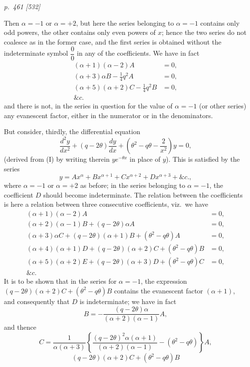 \documentclass[11pt,a4paper]{article}
\theoremstyle{plain}
\theoremstyle{definition}
\begin{document}
\clearpage

\bigskip
\textit{p.~461 [532]}
\smallskip

Then $\alpha=-1$ or $\alpha=+2$, but here the series belonging to $\alpha=-1$ contains only odd
powers, the other contains only even powers of $x$; hence the two series do not
coalesce as in the former case, and the first series is obtained without the indeterminate symbol $\dfrac{0}{0}$ in any of the coefficients. We have in fact
\begin{align*}
(\alpha+1)(\alpha-2)A&=0,\\
(\alpha+3)\alpha B-\tfrac14q^2A&=0,\\
(\alpha+5)(\alpha+2)C-\tfrac14q^2B&=0,\\
\&c.
\end{align*}
and there is not, in the series in question for the value of $\alpha = -1$ (or other series) any evanescent
factor, either in the numerator or in the denominators.

But consider, thirdly, the differential equation
\[
\frac{d^2y}{dx^2}+(q-2\theta)\frac{dy}{dx}
+\left(\theta^2-q\theta-\frac{2}{x^2}\right)y=0 \tag{III},
\]
(derived from (I) by writing therein $ye^{-\theta x}$ in place of $y$). This is satisfied by the series
\[
y = Ax^\alpha + Bx^{\alpha+1} + Cx^{\alpha+2} + Dx^{\alpha+3} + \&c.,
\]
where $\alpha=-1$ or $\alpha=+2$ as before; in the series belonging to $\alpha=-1$, the coefficient
$D$ should become indeterminate. The relation between the coefficients is here a
relation between three consecutive coefficients, viz.\ we have
\begin{align*}
(\alpha+1)(\alpha-2)A&=0,\\
(\alpha+2)(\alpha-1)B+(q-2\theta)\alpha A&=0,\\
(\alpha+3)\alpha C+(q-2\theta)(\alpha+1)B+(\theta^2-q\theta)A&=0,\\
(\alpha+4)(\alpha+1)D+(q-2\theta)(\alpha+2)C+(\theta^2-q\theta)B&=0,\\
(\alpha+5)(\alpha+2)E+(q-2\theta)(\alpha+3)D+(\theta^2-q\theta)C&=0,\\
\&c.
\end{align*}
It is to be shown that in the series for $\alpha=-1$, the expression
$(q-2\theta)(\alpha+2)C+(\theta^2-q\theta)B$ contains the evanescent factor $(\alpha+1)$,
and consequently that $D$ is indeterminate; we have in fact
\[
B=-\frac{(q-2\theta)\alpha}{(\alpha+2)(\alpha-1)}A,
\]
and thence
\[
C=\frac{1}{\alpha(\alpha+3)}
\left\{\frac{(q-2\theta)^2\alpha(\alpha+1)}{(\alpha+2)(\alpha-1)}
-(\theta^2-q\theta)\right\}A,
\]
\[
(q-2\theta)(\alpha+2)C+(\theta^2-q\theta)B
\]
\end{document}
